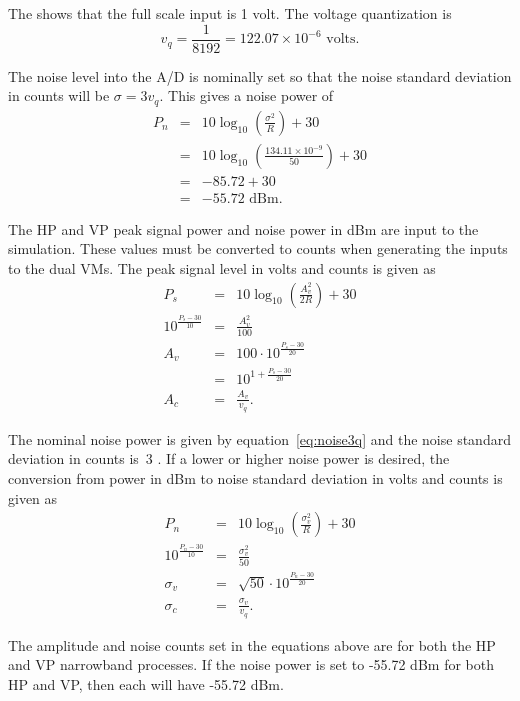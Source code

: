 \documentclass[12pt,english]{article}
\newcommand{\lp}{\left(}
\newcommand{\rp}{\right)}
\begin{document}
The shows that the full scale input is 1 volt. The voltage
quantization is
\begin{equation}
  v_q = \frac{1}{8192} = 122.07 \times 10^{-6} \mbox{ volts.}
\end{equation}

The noise level into the A/D is nominally set so that the noise standard
deviation in counts will be $\sigma = 3 v_q$. This gives a noise power of
\begin{eqnarray}\label{eq:noise3q}
  P_n &=&  10 \log_{10} \lp \frac{\sigma^2}{R} \rp + 30 \\
      &=&  10 \log_{10} \lp \frac{134.11 \times 10^{-9}}{50} \rp + 30 \nonumber\\
      &=&  -85.72 + 30 \nonumber\\
      &=&  -55.72 \mbox{ dBm.} \nonumber
\end{eqnarray}

The HP and VP peak signal power and noise power in dBm are input to
the simulation. These values must be converted to counts when
generating the inputs to the dual VMs. The peak signal level in volts
and counts is given as
\begin{eqnarray}\label{eq:amplitudeCounts}
  P_s &=& 10 \log_{10} \lp \frac{A_v^2}{2R} \rp + 30 \nonumber\\
  10^{ \frac{P_s - 30}{10}} &=& \frac{A_v^2}{100} \nonumber\\
  A_v &=& 100 \cdot 10^{ \frac{P_s - 30}{20}} \nonumber\\
    &=& 10^{1 + \frac{P_s - 30}{20}} \nonumber\\
  A_c &=& \frac{A_v}{v_q}.
\end{eqnarray}

The nominal noise power is given by equation~\vref{eq:noise3q} and the
noise standard deviation in counts is~3 . If a lower or higher noise
power is desired, the conversion from power in dBm to noise standard
deviation in volts and counts is given as
\begin{eqnarray}\label{eq:noiseCounts}
  P_n &=& 10 \log_{10} \lp \frac{\sigma_v^2}{R} \rp + 30 \nonumber\\
  10^{ \frac{P_n - 30}{10}}  &=& \frac{\sigma_v^2}{50} \nonumber\\
  \sigma_v &=& \sqrt{50} \cdot 10^{ \frac{P_n - 30}{20}} \nonumber\\
  \sigma_c &=& \frac{\sigma_v}{v_q}.
\end{eqnarray}

The amplitude and noise counts set in the equations above are for both
the HP and VP narrowband processes. If the noise power is set to
-55.72 dBm for both HP and VP, then each will have -55.72 dBm.
\end{document}
